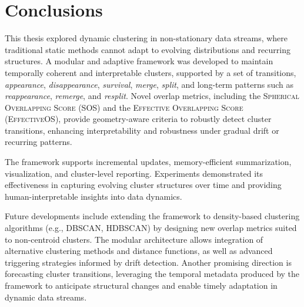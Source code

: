 \section{Conclusions}\label{sec:conclusions}

This thesis explored dynamic clustering in non-stationary data streams, where
traditional static methods cannot adapt to evolving distributions and recurring
structures. A modular and adaptive framework was developed to maintain
temporally coherent and interpretable clusters, supported by a set of
transitions, \emph{appearance}, \emph{disappearance}, \emph{survival},
\emph{merge}, \emph{split}, and long-term patterns such as
\emph{reappearance}, \emph{remerge}, and \emph{resplit}. Novel overlap metrics,
including the \textsc{Spherical Overlapping Score (SOS)} and the \textsc{Effective
    Overlapping Score (EffectiveOS)}, provide geometry-aware criteria to robustly
detect cluster transitions, enhancing interpretability and robustness under
gradual drift or recurring patterns.

The framework supports incremental updates, memory-efficient summarization,
visualization, and cluster-level reporting. Experiments demonstrated its
effectiveness in capturing evolving cluster structures over time and providing
human-interpretable insights into data dynamics.

Future developments include extending the framework to density-based clustering
algorithms (e.g., \textsc{DBSCAN}, \textsc{HDBSCAN}) by designing new overlap metrics suited to
non-centroid clusters. The modular architecture allows integration of
alternative clustering methods and distance functions, as well as advanced
triggering strategies informed by drift detection. Another promising direction
is forecasting cluster transitions, leveraging the temporal metadata produced
by the framework to anticipate structural changes and enable timely adaptation
in dynamic data streams.
